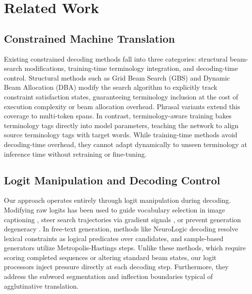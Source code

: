 \documentclass[conference]{IEEEtran}
\begin{document}
\section{Related Work}

\subsection{Constrained Machine Translation}

Existing constrained decoding methods fall into three categories: structural beam-search modifications, training-time terminology integration, and decoding-time control. Structural methods such as Grid Beam Search (GBS) \cite{hokamp2017lexically} and Dynamic Beam Allocation (DBA) \cite{post2018fast} modify the search algorithm to explicitly track constraint satisfaction states, guaranteeing terminology inclusion at the cost of execution complexity or beam allocation overhead. Phrasal variants \cite{hu2019improved} extend this coverage to multi-token spans. In contrast, terminology-aware training \cite{dinu2019training} bakes terminology tags directly into model parameters, teaching the network to align source terminology tags with target words. While training-time methods avoid decoding-time overhead, they cannot adapt dynamically to unseen terminology at inference time without retraining or fine-tuning.

\subsection{Logit Manipulation and Decoding Control}

Our approach operates entirely through logit manipulation during decoding. Modifying raw logits has been used to guide vocabulary selection in image captioning \cite{anderson2017guided}, steer search trajectories via gradient signals \cite{sha2020gradient}, or prevent generation degeneracy \cite{holtzman2020curious}. In free-text generation, methods like NeuroLogic decoding \cite{lu2021neurologic} resolve lexical constraints as logical predicates over candidates, and sample-based generators \cite{miao2019cgmh} utilize Metropolis-Hastings steps. Unlike these methods, which require scoring completed sequences or altering standard beam states, our logit processors inject pressure directly at each decoding step. Furthermore, they address the subword segmentation and inflection boundaries typical of agglutinative translation.
\end{document}
